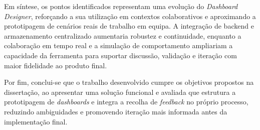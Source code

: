 Em síntese, os pontos identificados representam uma evolução do \textit{Dashboard Designer}, reforçando a sua utilização em contextos colaborativos e aproximando a prototipagem de cenários reais de trabalho em equipa. A integração de backend e armazenamento centralizado aumentaria robustez e continuidade, enquanto a colaboração em tempo real e a simulação de comportamento ampliariam a capacidade da ferramenta para suportar discussão, validação e iteração com maior fidelidade ao produto final.

Por fim, conclui-se que o trabalho desenvolvido cumpre os objetivos propostos na dissertação, ao apresentar uma solução funcional e avaliada que estrutura a prototipagem de \textit{dashboards} e integra a recolha de \textit{feedback} no próprio processo, reduzindo ambiguidades e promovendo iteração mais informada antes da implementação final.